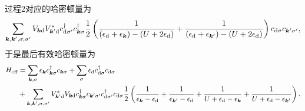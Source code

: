 过程2对应的哈密顿量为
\[
    \sum_{\vb*{k}, \vb*{k}', \sigma, \sigma'} V_{\vb*{k} \text{d}} V_{\vb*{k}' \text{d}}^*
    {c}^\dagger_{\text{d} \sigma'} {c}^\dagger_{\vb*{k} \sigma}
    \frac{1}{2} \left(
        \frac{1}{(\epsilon_\text{d} + \epsilon_{\vb*{k}}) - (U + 2 \epsilon_{\text{d}})} + \frac{1}{(\epsilon_\text{d} + \epsilon_{\vb*{k}'}) - (U + 2 \epsilon_{\text{d}})}
    \right)
    {c}_{\text{d} \sigma} {c}_{\vb*{k}' \sigma'},
\]
于是最后有效哈密顿量为
\begin{equation}
    \begin{aligned}
        {H}_\text{eff} &= \sum_{\vb*{k}, \sigma} \epsilon_{\vb*{k}} {c}_{\vb*{k}\sigma}^\dagger {c}_{\vb*{k} \sigma} + \sum_\sigma \epsilon_\text{d} {c}_{\text{d}\sigma}^\dagger {c}_{\text{d} \sigma} \\
        & + \sum_{\vb*{k}, \vb*{k}', \sigma, \sigma'} V_{\vb*{k}' \text{d}}^* V_{\vb*{k} \text{d}} {c}^\dagger_{\vb*{k} \sigma} {c}_{\vb*{k}' \sigma'} {c}^\dagger_{\text{d} \sigma'} {c}_{\text{d} \sigma} 
        \frac{1}{2} \left( \frac{1}{\epsilon_{\vb*{k}}- \epsilon_\text{d}} + \frac{1}{\epsilon_{\vb*{k}'} - \epsilon_\text{d}} + \frac{1}{U + \epsilon_\text{d} - \epsilon_{\vb*{k}}} + \frac{1}{U + \epsilon_\text{d} - \epsilon_{\vb*{k}'}} \right).
    \end{aligned}
    \label{eq:effective-anderson}
\end{equation}

